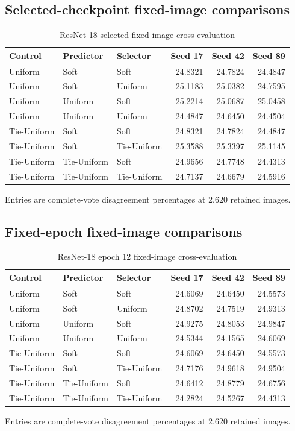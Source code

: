 \documentclass[10pt]{article}
\begin{document}
\subsection*{Selected-checkpoint fixed-image comparisons}\begin{longtable}{lllrrr}\caption{ResNet-18 selected fixed-image cross-evaluation}\\\toprule Control & Predictor & Selector & Seed 17 & Seed 42 & Seed 89\\\midrule\endhead
Uniform & Soft & Soft & 24.8321 & 24.7824 & 24.4847\\
Uniform & Soft & Uniform & 25.1183 & 25.0382 & 24.7595\\
Uniform & Uniform & Soft & 25.2214 & 25.0687 & 25.0458\\
Uniform & Uniform & Uniform & 24.4847 & 24.6450 & 24.4504\\
Tie-Uniform & Soft & Soft & 24.8321 & 24.7824 & 24.4847\\
Tie-Uniform & Soft & Tie-Uniform & 25.3588 & 25.3397 & 25.1145\\
Tie-Uniform & Tie-Uniform & Soft & 24.9656 & 24.7748 & 24.4313\\
Tie-Uniform & Tie-Uniform & Tie-Uniform & 24.7137 & 24.6679 & 24.5916\\
\bottomrule\end{longtable}
Entries are complete-vote disagreement percentages at 2,620 retained images.

\clearpage
\subsection*{Fixed-epoch fixed-image comparisons}\begin{longtable}{lllrrr}\caption{ResNet-18 epoch 12 fixed-image cross-evaluation}\\\toprule Control & Predictor & Selector & Seed 17 & Seed 42 & Seed 89\\\midrule\endhead
Uniform & Soft & Soft & 24.6069 & 24.6450 & 24.5573\\
Uniform & Soft & Uniform & 24.8702 & 24.7519 & 24.9313\\
Uniform & Uniform & Soft & 24.9275 & 24.8053 & 24.9847\\
Uniform & Uniform & Uniform & 24.5344 & 24.1565 & 24.6069\\
Tie-Uniform & Soft & Soft & 24.6069 & 24.6450 & 24.5573\\
Tie-Uniform & Soft & Tie-Uniform & 24.7176 & 24.9618 & 24.9504\\
Tie-Uniform & Tie-Uniform & Soft & 24.6412 & 24.8779 & 24.6756\\
Tie-Uniform & Tie-Uniform & Tie-Uniform & 24.2824 & 24.5267 & 24.4313\\
\bottomrule\end{longtable}
Entries are complete-vote disagreement percentages at 2,620 retained images.
\end{document}
